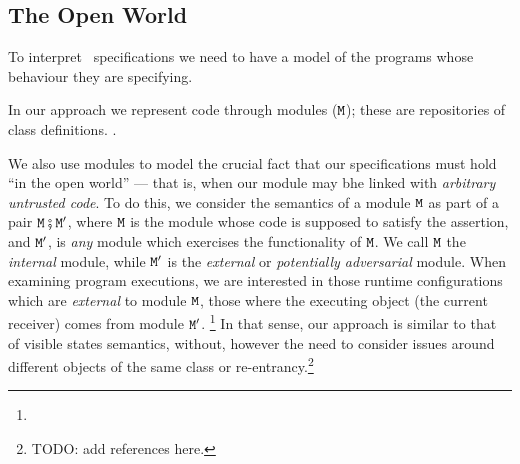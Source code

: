 



\subsection{The Open World}

   
To interpret \Chainmail\ specifications we need to have a model of the
programs whose behaviour they are specifying.

In our approach we represent code through modules (${\mbox{\tt{\ensuremath{{\mbox{\tt{M}}}}}}}$); these are
repositories of class definitions. .  

We also use modules to model the crucial fact that our specifications
must hold ``in the open world'' --- that is, when our module may bhe
linked with \textit{arbitrary untrusted code}. To do this, we consider
the semantics of a module ${\mbox{\tt{\ensuremath{{\mbox{\tt{M}}}}}}}$ as part of a pair
${\mbox{\tt{\ensuremath{{\mbox{\tt{M}}}}}}} \fatsemi {{\mbox{\tt{\ensuremath{{\mbox{\tt{M}}}}}}}'}$,  where ${\mbox{\tt{\ensuremath{{\mbox{\tt{M}}}}}}}$ is the module 
whose code is supposed to satisfy the assertion,
and ${\mbox{\tt{\ensuremath{{\mbox{\tt{M}}}}}}}'$, is \textit{any} module which exercises
the functionality of ${\mbox{\tt{\ensuremath{{\mbox{\tt{M}}}}}}}$. We call ${\mbox{\tt{\ensuremath{{\mbox{\tt{M}}}}}}}$ the {\em internal} module, while ${\mbox{\tt{\ensuremath{{\mbox{\tt{M}}}}}}}'$ is the {\em external}
or {\em potentially adversarial} module. When examining program executions, we are interested
 in those runtime configurations which are {\em external} to module ${\mbox{\tt{\ensuremath{{\mbox{\tt{M}}}}}}}$, \ie those where the
 executing object (\ie the current receiver) comes from module ${\mbox{\tt{\ensuremath{{\mbox{\tt{M}}}}}}}'$.
 \footnote{}
 In  that sense, our approach is similar to that of visible states semantics, without, however the need to consider issues
around different objects of the same class or re-entrancy.\footnote{TODO: add references here.}



  
